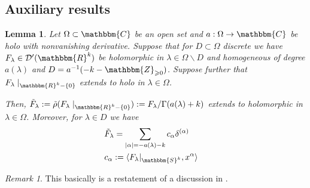 \documentclass{article}
\newcommand{\assign}{:=}
\newtheorem{lemma}[proposition]{Lemma}
\theoremstyle{remark}
\newtheorem{remark}[proposition]{Remark}
\begin{document}
\subsection{Auxiliary results}

\begin{lemma}
  \label{supp-R:lem-gelfand}Let $\Omega \subset \mathbbm{C}$ be an open set
  and $a : \Omega \rightarrow \mathbbm{C}$ be holo with nonvanishing
  derivative. Suppose that for $D \subset \Omega$ discrete we have
  $F_{\lambda} \in \mathcal{D}' (\mathbbm{R}^k)$ be holomorphic in $\lambda
  \in \Omega \backslash D$ and homogeneous of degree $a (\lambda)$ and $D =
  a^{- 1} (- k -\mathbbm{Z}_{\geqslant 0})$. Suppose further that $F_{\lambda}
  \mid_{\mathbbm{R}^k - \{ 0 \}}$ extends to holo in $\lambda \in \Omega$.
  
  Then, $\tilde{F}_{\lambda} : = \tilde{\rho} (F_{\lambda} \mid_{\mathbbm{R}^k
  - \{ 0 \}}) \assign F_{\lambda} / \Gamma (a (\lambda) + k)$ extends to
  holomorphic in $\lambda \in \Omega$. Moreover, for $\lambda \in D$ we
  have
  \begin{eqnarray}
    & \tilde{F}_{\lambda} = \sum_{| \alpha | = - a (\lambda) - k}
    c_{\alpha} \delta^{(\alpha)} &  \nonumber\\
    & c_{\alpha} \assign \langle F_{\lambda} |_{\mathbbm{S}^k}, x^{\alpha}
    \rangle &  \nonumber
  \end{eqnarray}
\end{lemma}

\begin{remark}
  This basically is a restatement of a discussion in
  {\cite[III.{\textsection}3.5]{gelfand1980distribution}}.
\end{remark}
\end{document}
